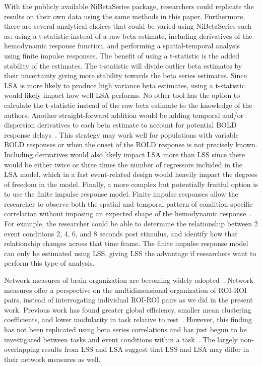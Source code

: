 \documentclass[phd,appendix,figures]{uithesis}
\begin{document}
With the publicly available NiBetaSeries package, researchers could replicate the
results on their own data using the same methods in this paper.
Furthermore, there are several analytical choices that could be varied using NiBetaSeries such as:
using a t-statistic instead of a raw beta estimate, including derivatives of the hemodynamic response function,
and performing a spatial-temporal analysis using finite impulse responses.
The benefit of using a t-statistic is the added stability of the estimates.
The t-statistic will divide outlier beta estimates by their uncertainty giving more stability
towards the beta series estimates.
Since LSA is more likely to produce high variance beta estimates, using a t-statistic would likely impact
how well LSA performs.
No other tool has the option to calculate the t-statistic instead of the raw beta estimate to the knowledge
of the authors.
Another straight-forward addition would be adding temporal and/or dispersion derivatives to each beta
estimate to account for potential BOLD response delays~\cite{Calhoun2004,Gottlich2015}.
This strategy may work well for populations with variable BOLD responses or when the onset of the BOLD
response is not precisely known.
Including derivatives would also likely impact LSA more than LSS since there would be either twice or
three times the number of regressors included in the LSA model, which in a fast event-related design
would heavily impact the degrees of freedom in the model.
Finally, a more complex but potentially fruitful option is to use the finite impulse response model.
Finite impulse responses allow the researcher to observe both the spatial and temporal pattern of
condition specific correlation without imposing an expected shape of the hemodynamic response~\cite{Turner2012a}.
For example, the researcher could be able to determine the relationship between 2 event conditions
2, 4, 6, and 8 seconds post stimulus, and identify how that relationship changes across
that time frame.
The finite impulse response model can only be estimated using LSS, giving LSS the advantage if researchers
want to perform this type of analysis.

Network measures of brain organization are becoming widely adopted~\cite{Rubinov2010}.
Network measures offer a perspective on the multidimensional organization of ROI-ROI pairs, instead of
interrogating individual ROI-ROI pairs as we did in the present work.
Previous work has found greater global efficiency, smaller mean clustering coefficients, and lower modularity in
task relative to rest~\cite{Di2013}.
However, this finding has not been replicated using beta series correlations and has just begun
to be investigated between tasks and event conditions within a task~\cite{Di2019a}.
The largely non-overlapping results from LSS and LSA suggest that LSS and LSA may differ
in their network measures as well.
\end{document}
